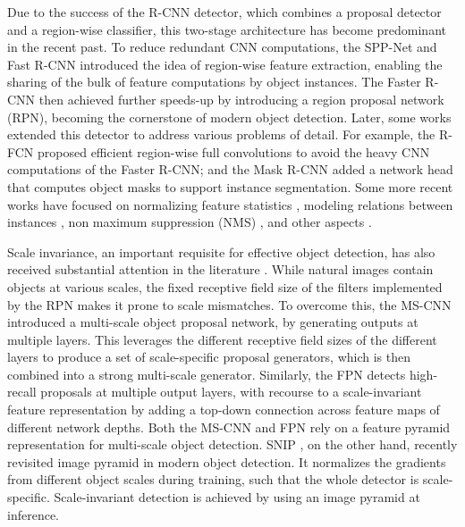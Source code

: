 \documentclass[10pt,journal,compsoc]{IEEEtran}
\begin{document}
Due to the success of  the R-CNN \cite{DBLP:conf/cvpr/GirshickDDM14}
detector, which combines a proposal detector and a
region-wise classifier, this two-stage architecture has become predominant
in the recent past. To reduce redundant CNN computations, the
SPP-Net \cite{DBLP:conf/eccv/HeZR014} and Fast
R-CNN \cite{DBLP:conf/iccv/Girshick15} introduced
the idea of region-wise feature extraction, enabling the sharing of
the bulk of feature computations by object instances. The Faster
R-CNN \cite{DBLP:conf/nips/RenHGS15} then achieved further speeds-up by
introducing a region proposal network (RPN), becoming the cornerstone of
modern object detection. Later, some works extended this detector to
address various problems of detail. For example, the
R-FCN \cite{DBLP:conf/nips/DaiLHS16}
proposed efficient region-wise full convolutions to avoid the heavy CNN
computations of the Faster R-CNN; and the Mask R-CNN \cite{he2017mask} added
a network head that computes object masks to support instance segmentation.
Some more recent works have focused on normalizing feature
statistics \cite{peng2018megdet,DBLP:conf/eccv/WuH18}, modeling
relations between instances \cite{hu2018relation}, non maximum
suppression (NMS) \cite{DBLP:conf/iccv/BodlaSCD17}, and
other aspects \cite{DBLP:conf/cvpr/ShrivastavaGG16,liu2018path}.

Scale invariance, an important requisite for effective object detection,
has also received substantial attention in the
literature \cite{DBLP:conf/eccv/CaiFFV16,lin2017feature,singh2018analysis}.
While natural images contain objects at various scales, the
fixed receptive field size of the filters implemented by the
RPN \cite{DBLP:conf/nips/RenHGS15} makes it prone to scale mismatches.
To overcome this, the MS-CNN \cite{DBLP:conf/eccv/CaiFFV16} introduced a
multi-scale object proposal network, by generating outputs at multiple layers.
This leverages the different receptive field sizes of the different layers
to produce a set of scale-specific proposal generators, which is then
combined into a strong multi-scale generator. Similarly, the
FPN \cite{lin2017feature} detects high-recall proposals at multiple output layers, with recourse to a scale-invariant feature representation by adding a top-down
connection across feature maps of different network depths. Both the
MS-CNN and FPN rely on a feature pyramid representation for multi-scale object detection. SNIP \cite{singh2018analysis}, on the other hand,
recently revisited image pyramid in modern object detection. It normalizes the gradients from different object scales during training, such that the whole detector is scale-specific. Scale-invariant detection is
achieved by using an image pyramid at inference.
\end{document}
